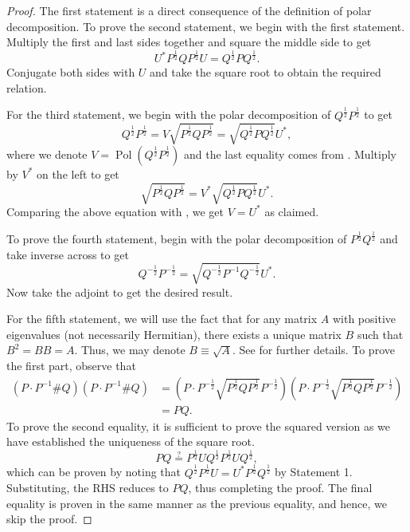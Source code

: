 \documentclass[12pt]{article}
\theoremstyle{definition}
\begin{document}
\begin{proof}
The first statement is a direct consequence of the definition of polar decomposition. To prove the second statement, we begin with the first statement. Multiply the first and last sides together and square the middle side to get 
\begin{equation} U^* P^{\frac 12} Q P^{\frac 12} U = Q^{\frac 12} P Q^{\frac 12}. \end{equation}
Conjugate both sides with $U$ and take the square root to obtain the required relation.

For the third statement, we begin with the polar decomposition of $Q^{\frac 12} P^{\frac 12}$ to get
\begin{equation} Q^{\frac 12} P^{\frac 12} = V \sqrt{P^{\frac 12} Q P^{\frac 12}} = \sqrt{Q^{\frac 12} P Q^{\frac 12}} U^*, \end{equation}
where we denote $V = \operatorname{Pol}\left(Q^{\frac 12} P^{\frac 12}\right)$ and the last equality comes from . Multiply by $V^*$ on the left to get
\begin{equation} \sqrt{P^{\frac 12} Q P^{\frac 12}} = V^* \sqrt{Q^{\frac 12} P Q^{\frac 12}} U^*. \end{equation}
Comparing the above equation with , we get $V = U^*$ as claimed. 

To prove the fourth statement, begin with the polar decomposition of $P^{\frac 12} Q^{\frac 12}$ and take inverse across to get
\begin{equation} Q^{-\frac 12} P^{-\frac 12} = \sqrt{Q^{-\frac 12} P^{-1} Q^{-\frac 12}} U^*. \end{equation}
Now take the adjoint to get the desired result. 

For the fifth statement, we will use the fact that for any matrix $A$ with positive eigenvalues (not necessarily Hermitian), there exists a unique matrix $B$ such that $B^2 = B B = A$. Thus, we may denote $B \equiv \sqrt{A}$. See \cite[Excercise 4.5.2]{bhatiamatrixanalysis} for further details. To prove the first part, observe that
\begin{equation}
\begin{aligned}
        (P \cdot P ^{-1} \# Q) \left(P \cdot P ^{-1} \# Q\right) &= \left(P \cdot P ^{-\frac 12}  \sqrt{P ^{\frac 12} Q P ^{\frac 12} } P ^{-\frac 12} \right)  \left( P \cdot P ^{-\frac 12}  \sqrt{P ^{\frac 12} Q P ^{\frac 12} } P ^{-\frac 12} \right) \\ &=  PQ. 
\end{aligned}
\end{equation}
To prove the second equality, it is sufficient to prove the squared version as we have established the uniqueness of the square root. 
\begin{equation} PQ \stackrel{?}{=} P^{\frac 12} U Q^{\frac 12} P^{\frac 12} U Q^{\frac 12}, \end{equation}
which can be proven by noting that $Q^{\frac 12} P^{\frac 12} U = U^* P^{\frac 12} Q^{\frac 12}$ by Statement 1. Substituting, the RHS reduces to $PQ$, thus completing the proof. The final equality is proven in the same manner as the previous equality, and hence, we skip the proof. 
\end{proof}
\end{document}
